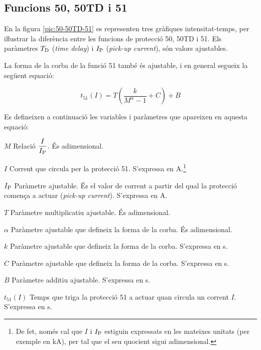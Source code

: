 \subsection{Funcions 50, 50TD i 51}

En la figura \vref{pic:50-50TD-51} es representen tres gràfiques intensitat-temps, per iŀlustrar la diferència entre les funcions de protecció 50, 50TD i 51. Els paràmetres $T_\mathrm{D}$ (\textit{time delay}) i $I_\mathrm{P}$ (\textit{pick-up current}), són valors ajustables.
\begin{center}
    
    \label{pic:50-50TD-51}
\end{center}

\break
La forma de la corba de la funció 51 també és ajustable, i en general segueix la següent equació:

\begin{equation}\label{eq:corba-50-51}
  t_{51}(I) = T \left( \frac{k}{M^\alpha -1} + C \right) + B
\end{equation}

Es defineixen a continuació les variables i paràmetres que apareixen en aquesta equació:
\begin{list}{}
   {\setlength{\labelwidth}{15mm} \setlength{\leftmargin}{15mm} \setlength{\labelsep}{5mm}}
        \item[$M$] Relació $\dfrac{I}{I_\mathrm{P}}$. És adimensional.
        \item[$I$] Corrent que circula per la protecció 51. S'expressa en A.\footnote{\label{fn:I-Ip}De fet, només cal que $I$ i $I_\mathrm{P}$ estiguin expressats en les mateixes unitats (per exemple en kA), per tal  que el seu quocient sigui adimensional.}
        \item[$I_\mathrm{P}$] Paràmetre ajustable. És el valor de corrent a partir del qual la  protecció comença a actuar (\textit{pick-up current}). S'expressa en A.
        \item[$T$] Paràmetre multiplicatiu ajustable. És adimensional.
        \item[$\alpha$] Paràmetre ajustable que defineix la forma de la corba. És adimensional.
        \item[$k$] Paràmetre ajustable que defineix la forma de la corba. S'expressa en s.
        \item[$C$] Paràmetre ajustable que defineix la forma de la corba. S'expressa en s.
        \item[$B$] Paràmetre additiu ajustable. S'expressa en s.
        \item[$t_{51}(I)$] Temps que triga la protecció 51 a actuar quan circula un corrent $I$. S'expressa en s.
\end{list}

